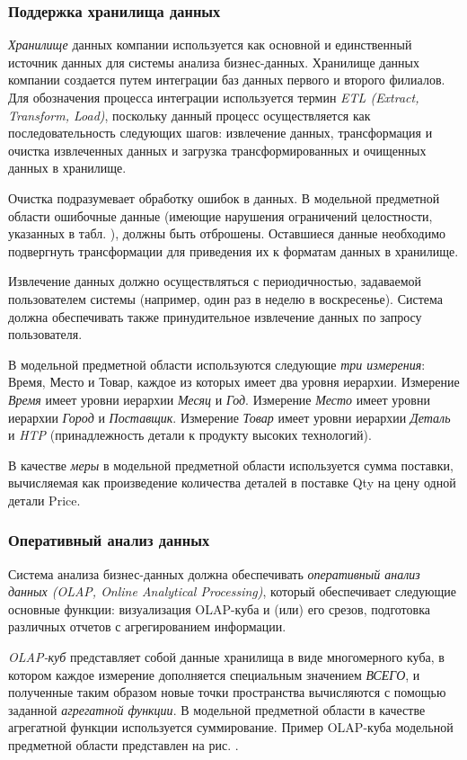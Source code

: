 \subsubsection{Поддержка хранилища данных}
\textit{Хранилище} данных компании используется как основной и единственный 
источник данных для системы анализа бизнес-данных. Хранилище данных компании 
создается путем интеграции баз данных первого и второго филиалов. Для 
обозначения процесса интеграции используется термин \textit{ETL (Extract, 
Transform, Load)}, поскольку данный процесс осуществляется как 
последовательность следующих шагов: извлечение данных, трансформация и очистка 
извлеченных данных и загрузка трансформированных и очищенных данных в хранилище. 
\par
Очистка подразумевает обработку ошибок в данных. В модельной предметной области 
ошибочные данные (имеющие нарушения ограничений целостности, указанных в табл. 
), должны быть отброшены. Оставшиеся данные необходимо 
подвергнуть трансформации для приведения их к форматам данных в хранилище.\par
Извлечение данных должно осуществляться с периодичностью, задаваемой 
пользователем системы (например, один раз в неделю в воскресенье). Система 
должна обеспечивать также принудительное извлечение данных по запросу 
пользователя.\par
В модельной предметной области используются следующие \textit{три измерения}: 
Время, Место и Товар, каждое из которых имеет два уровня иерархии. Измерение 
\textit{Время} имеет уровни иерархии \textit{Месяц} и \textit{Год}. Измерение 
\textit{Место} имеет уровни иерархии \textit{Город} и \textit{Поставщик}. 
Измерение \textit{Товар} имеет уровни иерархии \textit{Деталь} и \textit{HTP} 
(принадлежность детали к продукту высоких технологий).\par
В качестве \textit{меры} в модельной предметной области используется сумма 
поставки, вычисляемая как произведение количества деталей в поставке Qty на цену 
одной детали Price.\par

\subsubsection{Оперативный анализ данных}
Система анализа бизнес-данных должна обеспечивать \textit{оперативный анализ 
данных (OLAP, Online Analytical Processing)}, который обеспечивает следующие 
основные функции: визуализация OLAP-куба и (или) его срезов, подготовка 
различных отчетов с агрегированием информации. \par
\textit{OLAP-куб} представляет собой данные хранилища в виде многомерного куба, 
в котором каждое измерение дополняется специальным значением \textit{ВСЕГО}, и 
полученные таким образом новые точки пространства вычисляются с помощью 
заданной \textit{агрегатной функции}.
В модельной предметной области в качестве агрегатной функции используется суммирование. Пример OLAP-куба модельной предметной области представлен на рис. .

